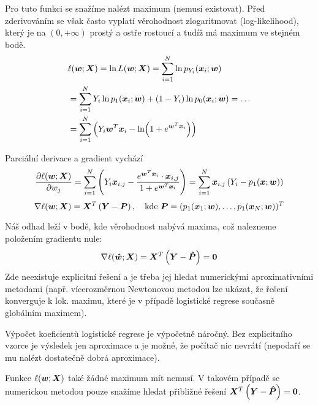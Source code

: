 \documentclass[../main.tex]{subfiles}
\begin{document}
Pro tuto funkci se snažíme nalézt maximum (nemusí existovat). Před zderivováním se však často vyplatí věrohodnost zlogaritmovat (log-likelihood), který je na $(0, +\infty)$ prostý a ostře rostoucí a tudíž má maximum ve stejném bodě.
\begin{align*}
     & \ell(\bm{w}; \bm{X}) = \ln L(\bm{w}; \bm{X})
    = \sum_{i=1}^{N} \ln p_{Y_i}(\bm{x}_i; \bm{w})                                                \\
     & = \sum_{i=1}^{N} Y_i \ln p_{1}(\bm{x}_i; \bm{w}) + (1 - Y_i) \ln p_{0}(\bm{x}_i; \bm{w}) = \ldots \\
     & = \sum_{i=1}^{N} \left(Y_i \bm{w}^T\bm{x}_i - \ln(1+e^{\bm{w}^T\bm{x}_i})\right)
\end{align*}

Parciální derivace a gradient vychází
\begin{equation*}
    \pdv{\ell(\bm{w}; \bm{X})}{w_j}
    = \sum_{i=1}^{N} \left(Y_i \bm{x}_{i,j} - \frac{e^{\bm{w}^T\bm{x}_i} \cdot \bm{x}_{i,j}}{1+e^{\bm{w}^T\bm{x}_i}}\right) = \sum_{i=1}^{N} \bm{x}_{i,j} \left(Y_i - p_1(\bm{x}; \bm{w})\right)
\end{equation*}
\begin{equation*}
    \nabla \ell(\bm{w}; \bm{X})
    = \bm{X}^T\left(\bm{Y} - \bm{P}\right), \quad
    \text{kde } \bm{P} = (p_1(\bm{x}_1; \bm{w}), \ldots, p_1(\bm{x}_N; \bm{w}))^T
\end{equation*}

Náš odhad leží v bodě, kde věrohodnost nabývá maxima, což nalezneme položením gradientu nule:
\begin{equation*}
    \nabla \ell(\bm{\hat{w}}; \bm{X})
    = \bm{X}^T\left(\bm{Y} - \bm{\hat{P}}\right)
    = \bm{0}
\end{equation*}
Zde neexistuje explicitní řešení a je třeba jej hledat numerickými aproximativními metodami (např. vícerozměrnou Newtonovou metodou lze ukázat, že řešení konverguje k lok. maximu, které je v případě logistické regrese současně globálním maximem).

Výpočet koeficientů logistické regrese je výpočetně náročný. Bez explicitního vzorce je výsledek jen aproximace a je možné, že počítač nic nevrátí (nepodaří se mu nalézt dostatečně dobrá aproximace).

Funkce $\ell(\bm{w}; \bm{X})$ také žádné maximum mít nemusí. V takovém případě se numerickou metodou pouze snažíme hledat přibližné řešení $\bm{X}^T\left(\bm{Y} - \bm{\hat{P}}\right) = \bm{0}$.
\end{document}

